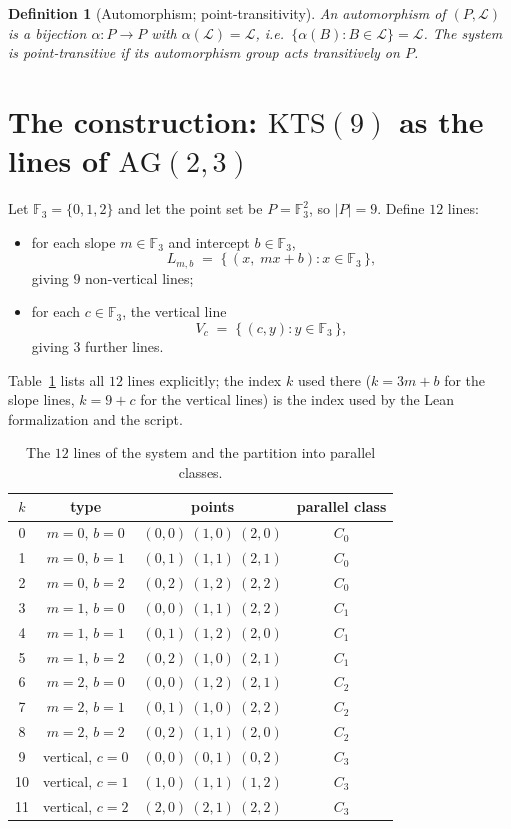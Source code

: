 \documentclass[11pt]{article}
\newtheorem{definition}{Definition}
\begin{document}
\begin{definition}[Automorphism; point-transitivity]
An \emph{automorphism} of $(P,\mathcal{L})$ is a bijection
$\alpha : P \to P$ with $\alpha(\mathcal{L}) = \mathcal{L}$, i.e.\
$\{ \alpha(B) : B \in \mathcal{L} \} = \mathcal{L}$.  The system is
\emph{point-transitive} if its automorphism group acts transitively on $P$.
\end{definition}

\section{The construction: $\mathrm{KTS}(9)$ as the lines of $\mathrm{AG}(2,3)$}

Let $\mathbb{F}_3 = \{0,1,2\}$ and let the point set be
$P = \mathbb{F}_3^2$, so $|P| = 9$.  Define $12$ lines:
\begin{itemize}
\item for each slope $m \in \mathbb{F}_3$ and intercept $b \in \mathbb{F}_3$,
\[
L_{m,b} \;=\; \{\, (x,\; mx+b) : x \in \mathbb{F}_3 \,\},
\]
giving $9$ non-vertical lines;
\item for each $c \in \mathbb{F}_3$, the vertical line
\[
V_c \;=\; \{\, (c, y) : y \in \mathbb{F}_3 \,\},
\]
giving $3$ further lines.
\end{itemize}
Table~\ref{tab:lines} lists all $12$ lines explicitly; the index $k$ used
there ($k = 3m+b$ for the slope lines, $k = 9+c$ for the vertical lines) is
the index used by the Lean formalization and the script.

\begin{table}[ht]
\centering
\begin{tabular}{cccc}
\toprule
$k$ & type & points & parallel class \\
\midrule
0 & $m{=}0,\, b{=}0$ & $(0,0)\ (1,0)\ (2,0)$ & $C_0$ \\
1 & $m{=}0,\, b{=}1$ & $(0,1)\ (1,1)\ (2,1)$ & $C_0$ \\
2 & $m{=}0,\, b{=}2$ & $(0,2)\ (1,2)\ (2,2)$ & $C_0$ \\
3 & $m{=}1,\, b{=}0$ & $(0,0)\ (1,1)\ (2,2)$ & $C_1$ \\
4 & $m{=}1,\, b{=}1$ & $(0,1)\ (1,2)\ (2,0)$ & $C_1$ \\
5 & $m{=}1,\, b{=}2$ & $(0,2)\ (1,0)\ (2,1)$ & $C_1$ \\
6 & $m{=}2,\, b{=}0$ & $(0,0)\ (1,2)\ (2,1)$ & $C_2$ \\
7 & $m{=}2,\, b{=}1$ & $(0,1)\ (1,0)\ (2,2)$ & $C_2$ \\
8 & $m{=}2,\, b{=}2$ & $(0,2)\ (1,1)\ (2,0)$ & $C_2$ \\
9 & vertical, $c{=}0$ & $(0,0)\ (0,1)\ (0,2)$ & $C_3$ \\
10 & vertical, $c{=}1$ & $(1,0)\ (1,1)\ (1,2)$ & $C_3$ \\
11 & vertical, $c{=}2$ & $(2,0)\ (2,1)\ (2,2)$ & $C_3$ \\
\bottomrule
\end{tabular}
\caption{The $12$ lines of the system and the partition into parallel classes.}
\label{tab:lines}
\end{table}
\end{document}

